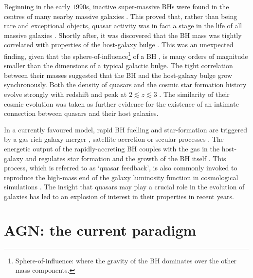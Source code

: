 Beginning in the early $1990$s, inactive super-massive BHs were found in the centres of many nearby massive galaxies \citep[e.g.][]{kormendy95,ferrarese05,kormendy13}.
This proved that, rather than being rare and exceptional objects, quasar activity was in fact a stage in the life of all massive galaxies \citep[e.g.][]{lynden-bell69}. 
Shortly after, it was discovered that the BH mass was tightly correlated with properties of the host-galaxy bulge \citep[e.g. the stellar velocity dispersion, $\sigma$, which is proportional to the bulge mass; e.g.][]{magorrian98,ferrarese00,gebhardt00,graham01,tremaine02,marconi03,aller07,gultekin09}.
This was an unexpected finding, given that the sphere-of-influence\footnote{Sphere-of-influence: where the gravity of the BH dominates over the other mass components.} of a BH \citep[$\lesssim100$ parsecs; e.g.][]{kormendy13}, is many orders of magnitude smaller than the dimensions of a typical galactic bulge. 
The tight correlation between their masses suggested that the BH and the host-galaxy bulge grow synchronously.
Both the density of quasars and the cosmic star formation history evolve strongly with redshift and peak at $2 \lesssim z \lesssim 3$ \citep[e.g.][]{boyle98,brandt05,richards06b}. 
The similarity of their cosmic evolution was taken as further evidence for the existence of an intimate connection between quasars and their host galaxies. 

In a currently favoured model, rapid BH fuelling and star-formation are triggered by a gas-rich galaxy merger \citep[e.g.][]{hopkins06a}, satellite accretion or secular processes \citep[e.g.][]{fanidakis12}. 
The energetic output of the rapidly-accreting BH couples with the gas in the host-galaxy and regulates star formation and the growth of the BH itself \citep[e.g.][]{silk98,king03,dimatteo05,king15}. 
This process, which is referred to as `quasar feedback', is also commonly invoked to reproduce the high-mass end of the galaxy luminosity function in cosmological simulations \citep[e.g.][]{kauffmann00}.  
The insight that quasars may play a crucial role in the evolution of galaxies has led to an explosion of interest in their properties in recent years. 

\section{AGN: the current paradigm}

